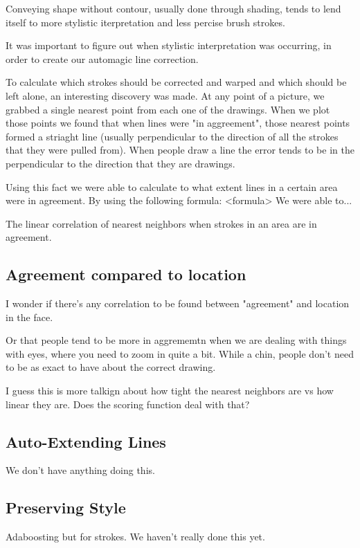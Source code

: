 Conveying shape without contour, usually done through shading, tends to lend itself to more stylistic iterpretation and less percise brush strokes. 

It was important to figure out when stylistic interpretation was occurring, in order to create our automagic line correction. 

To calculate which strokes should be corrected and warped and which should be left alone, an interesting discovery was made. At any point of a picture, we grabbed a single nearest point from each one of the drawings. When we plot those points we found that when lines were "in aggreement", those nearest points formed a striaght line (usually perpendicular to the direction of all the strokes that they were pulled from). When people draw a line the error tends to be in the perpendicular to the direction that they are drawings.

Using this fact we were able to calculate to what extent lines in a certain area were in agreement. By using the following formula:
<formula>
We were able to...

The linear correlation of nearest neighbors when strokes in an area are in agreement.

\subsection{Agreement compared to location}
I wonder if there's any correlation to be found between "agreement" and location in the face.

Or that people tend to be more in aggrememtn when we are dealing with things with eyes, where you need to zoom in quite a bit. While a chin, people don't need to be as exact to have about the correct drawing. 

I guess this is more talkign about how tight the nearest neighbors are vs how linear they are. Does the scoring function deal with that?

\subsection{Auto-Extending Lines}
We don't have anything doing this.

\subsection{Preserving Style}
Adaboosting but for strokes. We haven't really done this yet.

